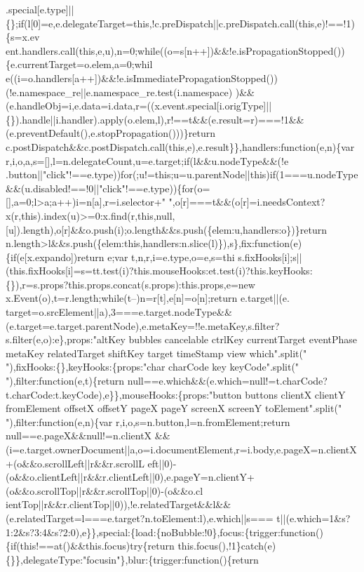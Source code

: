 \begin{DoxyCode}
{      .special[e.type]||\{\};if(l[0]=e,e.delegateTarget=this,!c.preDispatch||c.preDispatch.call(this,e)!==!1)\{s=x.ev
      ent.handlers.call(this,e,u),n=0;while((o=s[n++])&&!e.isPropagationStopped())\{e.currentTarget=o.elem,a=0;whil
      e((i=o.handlers[a++])&&!e.isImmediatePropagationStopped())(!e.namespace\_re||e.namespace\_re.test(i.namespace)
      )&&(e.handleObj=i,e.data=i.data,r=((x.event.special[i.origType]||\{\}).handle||i.handler).apply(o.elem,l),r!==t&&(e.result=r)===!1&&(e.preventDefault(),e.stopPropagation()))\}return
       c.postDispatch&&c.postDispatch.call(this,e),e.result\}\},handlers:function(e,n)\{var
       r,i,o,a,s=[],l=n.delegateCount,u=e.target;if(l&&u.nodeType&&(!e
      .button||"click"!==e.type))for(;u!=this;u=u.parentNode||this)if(1===u.nodeType&&(u.disabled!==!0||"click"!==e.type))\{for(o=[],a=0;l>a;a++)i=n[a],r=i.selector+"
       ",o[r]===t&&(o[r]=i.needsContext?x(r,this).index(u)>=0:x.find(r,this,null,[u]).length),o[r]&&o.push(i);o.length&&s.push(\{elem:u,handlers:o\})\}return
       n.length>l&&s.push(\{elem:this,handlers:n.slice(l)\}),s\},fix:function(e)\{if(e[x.expando])return e;var
       t,n,r,i=e.type,o=e,s=thi
      s.fixHooks[i];s||(this.fixHooks[i]=s=tt.test(i)?this.mouseHooks:et.test(i)?this.keyHooks:\{\}),r=s.props?this.props.concat(s.props):this.props,e=new x.Event(o),t=r.length;while(t--)n=r[t],e[n]=o[n];return
       e.target||(e.
      target=o.srcElement||a),3===e.target.nodeType&&(e.target=e.target.parentNode),e.metaKey=!!e.metaKey,s.filter?s.filter(e,o):e\},props:"altKey bubbles cancelable ctrlKey currentTarget eventPhase metaKey relatedTarget
       shiftKey target timeStamp view which".split(" "),fixHooks:\{\},keyHooks:\{props:"char charCode key
       keyCode".split(" "),filter:function(e,t)\{return
       null==e.which&&(e.which=null!=t.charCode?t.charCode:t.keyCode),e\}\},mouseHooks:\{props:"button buttons clientX clientY fromElement offsetX offsetY pageX pageY screenX screenY
       toElement".split(" "),filter:function(e,n)\{var r,i,o,s=n.button,l=n.fromElement;return
       null==e.pageX&&null!=n.clientX
      &&(i=e.target.ownerDocument||a,o=i.documentElement,r=i.body,e.pageX=n.clientX+(o&&o.scrollLeft||r&&r.scrollL
      eft||0)-(o&&o.clientLeft||r&&r.clientLeft||0),e.pageY=n.clientY+(o&&o.scrollTop||r&&r.scrollTop||0)-(o&&o.cl
      ientTop||r&&r.clientTop||0)),!e.relatedTarget&&l&&(e.relatedTarget=l===e.target?n.toElement:l),e.which||s===
      t||(e.which=1&s?1:2&s?3:4&s?2:0),e\}\},special:\{load:\{noBubble:!0\},focus:\{trigger:function()\{if(this!==at()&&this.focus)try\{return this.focus(),!1\}catch(e)\{\}\},delegateType:"focusin"\},blur:\{trigger:function()\{return
}
\end{DoxyCode}

